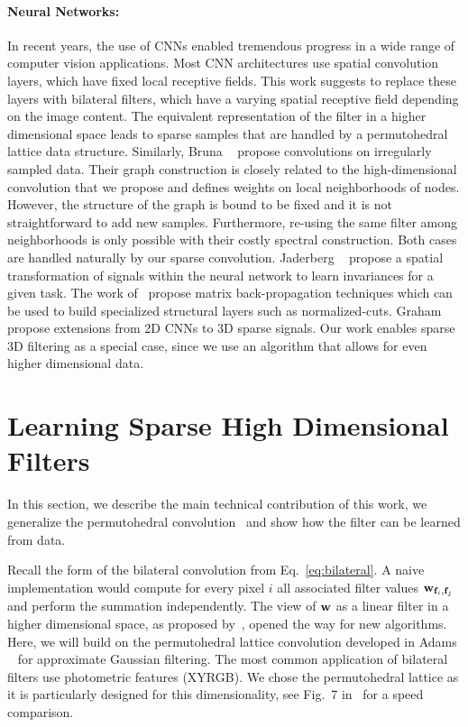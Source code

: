 \paragraph{Neural Networks:} In recent years, the use of CNNs enabled tremendous progress in a wide
range of computer vision applications. Most CNN architectures use
spatial convolution layers, which have fixed local receptive fields. This work
suggests to replace these layers with bilateral filters, which have a varying
spatial receptive field depending on the image content. The equivalent
representation of the filter in a higher dimensional space leads to sparse
samples that are handled by a permutohedral lattice data structure. Similarly,
Bruna \etal~\cite{bruna2013spectral} propose convolutions on irregularly sampled
data. Their graph construction is closely related to the high-dimensional
convolution that we propose and defines weights on local neighborhoods of nodes.
However, the structure of the graph is bound to be fixed and it is not
straightforward to add new samples. Furthermore, re-using the same filter
among neighborhoods is only possible with their costly spectral construction.
Both cases are handled naturally by our sparse convolution.
Jaderberg \etal~\cite{jaderberg2015spatial} propose a spatial
transformation of signals within the neural network to learn invariances for a
given task. The work of~\cite{ionescu2015matrix} propose matrix back-propagation
techniques which can be used to build specialized structural layers such as normalized-cuts.
Graham \etal~\cite{graham2015sparse} propose extensions from 2D CNNs
to 3D sparse signals. Our work enables sparse 3D filtering as a special case,
since we use an algorithm that allows for even higher dimensional data.


\section{Learning Sparse High Dimensional Filters}\label{sec:learning}
In this section, we describe the main technical contribution of
this work, we generalize the permutohedral convolution~\cite{adams2010fast} and show how
the filter can be learned from data.

Recall the form of the bilateral convolution from Eq.~\ref{eq:bilateral}. A naive
implementation would compute for every pixel $i$ all associated filter values $\mathbf{w}_{\mathbf{f}_i,\mathbf{f}_j}$ and
perform the summation independently. The view of $\mathbf{w}$ as a linear filter in a higher dimensional
space, as proposed by~\cite{paris2006fast}, opened the way for new algorithms. Here,
we will build on the permutohedral lattice convolution developed
in Adams \etal~\cite{adams2010fast} for approximate Gaussian filtering.
The most common application of bilateral filters use photometric features (XYRGB).
We chose the permutohedral lattice as it is particularly designed for this dimensionality,
see Fig.~7 in~\cite{adams2010fast} for a speed comparison.

